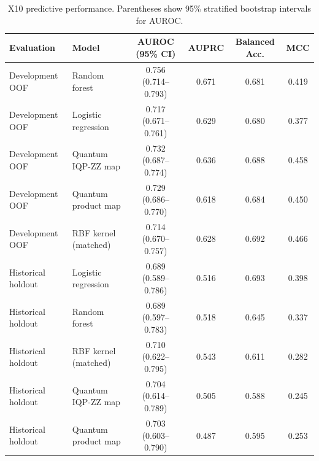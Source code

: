 \begin{table}[t]
\caption{X10 predictive performance. Parentheses show 95\% stratified bootstrap intervals for AUROC.}
\label{tab:main-results}
\centering
\small
\begin{tabular}{llcccc}
\toprule
Evaluation & Model & AUROC (95\% CI) & AUPRC & Balanced Acc. & MCC \\
\midrule
Development OOF & Random forest & 0.756 (0.714--0.793) & 0.671 & 0.681 & 0.419 \\
Development OOF & Logistic regression & 0.717 (0.671--0.761) & 0.629 & 0.680 & 0.377 \\
Development OOF & Quantum IQP-ZZ map & 0.732 (0.687--0.774) & 0.636 & 0.688 & 0.458 \\
Development OOF & Quantum product map & 0.729 (0.686--0.770) & 0.618 & 0.684 & 0.450 \\
Development OOF & RBF kernel (matched) & 0.714 (0.670--0.757) & 0.628 & 0.692 & 0.466 \\
\midrule
Historical holdout & Logistic regression & 0.689 (0.589--0.786) & 0.516 & 0.693 & 0.398 \\
Historical holdout & Random forest & 0.689 (0.597--0.783) & 0.518 & 0.645 & 0.337 \\
Historical holdout & RBF kernel (matched) & 0.710 (0.622--0.795) & 0.543 & 0.611 & 0.282 \\
Historical holdout & Quantum IQP-ZZ map & 0.704 (0.614--0.789) & 0.505 & 0.588 & 0.245 \\
Historical holdout & Quantum product map & 0.703 (0.603--0.790) & 0.487 & 0.595 & 0.253 \\
\bottomrule
\end{tabular}
\end{table}
